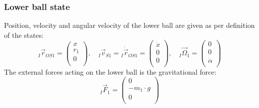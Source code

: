\documentclass{article}
\begin{document}
\subsubsection{Lower ball state}
Position, velocity and angular velocity of the lower ball are given as per definition of the states:
\begin{equation}
{}_I \vec{r}_{OS1} = 
\left( {\begin{array}{c} x \\ r_1 \\ 0 \\ \end{array} } \right), \quad 
{}_I \vec{v}_{S1} = {}_I \dot{\vec{r}}_{OS1} =
\left( {\begin{array}{c} \dot{x} \\ 0 \\ 0 \\ \end{array} } \right), \quad 
{}_I \vec{\Omega}_1 = 
\left( {\begin{array}{c} 0 \\ 0 \\ \dot{\alpha} \\ \end{array} } \right)
\end{equation}
The external forces acting on the lower ball is the gravitational force:
\begin{equation}
{}_I \vec{F}_{1} = \left( {\begin{array}{c} 0 \\ -m_1 \cdot g \\ 0 \\ \end{array} } \right)
\end{equation}
\end{document}
